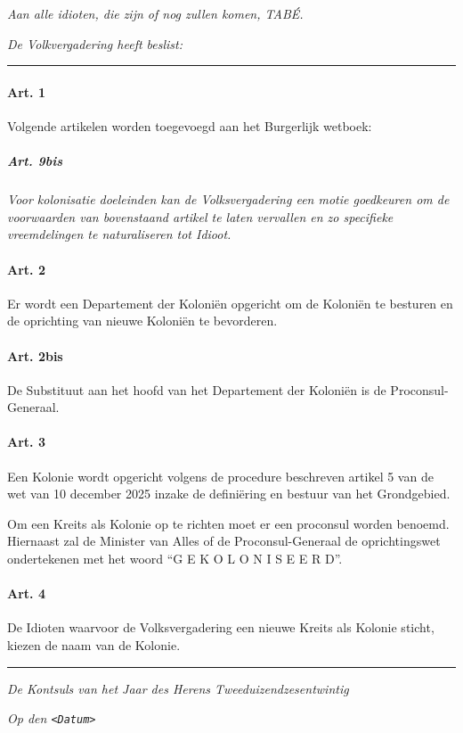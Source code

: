 \emph{Aan alle idioten, die zijn of nog zullen komen, TABÉ.}

\emph{De Volkvergadering heeft beslist:}

\begin{center}\rule{0.5\linewidth}{0.5pt}\end{center}

\hypertarget{art.-1}{%
\paragraph{Art. 1}\label{art.-1}}

Volgende artikelen worden toegevoegd aan het Burgerlijk wetboek:

\hypertarget{art.-9bis}{%
\subparagraph{\texorpdfstring{\emph{Art.
9bis}}{Art. 9bis}}\label{art.-9bis}}

\emph{Voor kolonisatie doeleinden kan de Volksvergadering een motie
goedkeuren om de voorwaarden van bovenstaand artikel te laten vervallen
en zo specifieke vreemdelingen te naturaliseren tot Idioot.}

\hypertarget{art.-2}{%
\paragraph{Art. 2}\label{art.-2}}

Er wordt een Departement der Koloniën opgericht om de Koloniën te
besturen en de oprichting van nieuwe Koloniën te bevorderen.

\hypertarget{art.-2bis}{%
\paragraph{Art. 2bis}\label{art.-2bis}}

De Substituut aan het hoofd van het Departement der Koloniën is de
Proconsul-Generaal.

\hypertarget{art.-3}{%
\paragraph{Art. 3}\label{art.-3}}

Een Kolonie wordt opgericht volgens de procedure beschreven artikel 5
van de wet van 10 december 2025 inzake de definiëring en bestuur van het
Grondgebied.

Om een Kreits als Kolonie op te richten moet er een proconsul worden
benoemd. Hiernaast zal de Minister van Alles of de Proconsul-Generaal de
oprichtingswet ondertekenen met het woord ``G E K O L O N I S E E R D''.

\hypertarget{art.-4}{%
\paragraph{Art. 4}\label{art.-4}}

De Idioten waarvoor de Volksvergadering een nieuwe Kreits als Kolonie
sticht, kiezen de naam van de Kolonie.

\begin{center}\rule{0.5\linewidth}{0.5pt}\end{center}

\emph{De Kontsuls van het Jaar des Herens Tweeduizendzesentwintig}

\emph{Op den \texttt{\textless{}Datum\textgreater{}}}
